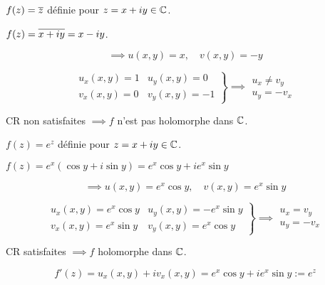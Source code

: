 \begin{example}[2]\hfill
    
    $f(z) = \overline{z}$ définie pour $z = x + iy \in \mathbb{C}$.
    
    $f(z) = \overline{x + iy} = x - iy$.
    
    \[\implies u(x,y) = x, \quad v(x,y) = -y\]
    
    \[\left.
    \begin{array}{ll}
    u_x(x,y) = 1 &
    u_y(x,y) = 0 \\
    v_x(x,y) = 0 &
    v_y(x,y) = -1
    \end{array}
    \right\} \implies
    \begin{array}{l}
    u_x \neq v_y \\
    u_y = -v_x
    \end{array}\]
    
    CR non satisfaites $\implies f$ n'est pas holomorphe dans $\mathbb{C}$.
\end{example}

\begin{example}[3]\hfill
    
    $f(z) = e^z$ définie pour $z = x + iy \in \mathbb{C}$.
    
    $f(z) = e^x (\cos y + i \sin y) = e^x \cos y + i e^x \sin y$
    
    \[\implies u(x,y) = e^x \cos y, \quad v(x,y) = e^x \sin y\]
    
    \[\left.
    \begin{array}{ll}
    u_x(x,y) = e^x \cos y &
    u_y(x,y) = -e^x \sin y \\
    v_x(x,y) = e^x \sin y &
    v_y(x,y) = e^x \cos y
    \end{array}
    \right\} \implies
    \begin{array}{l}
    u_x = v_y \\
    u_y = -v_x
    \end{array}\]
    
    CR satisfaites $\implies f$ holomorphe dans $\mathbb{C}$.
    
    \[f'(z) = u_x(x,y) + i v_x(x,y) = e^x \cos y + i e^x \sin y := e^z\]
\end{example}

